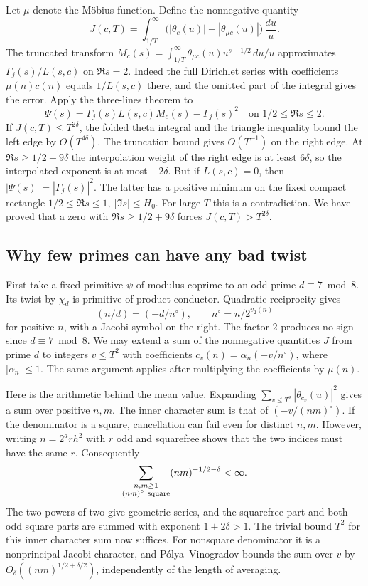 Let \(\mu\) denote the Möbius function. Define the nonnegative quantity
\[
 J(c,T)=\int_{1/T}^\infty
       \bigl(|\theta_c(u)|+|\theta_{\mu c}(u)|\bigr)\,\frac{du}{u}.
\]
The truncated transform \(M_c(s)=\int_{1/T}^\infty \theta_{\mu c}(u)u^{s-1/2}\,du/u\) approximates \(\Gamma_j(s)/L(s,c)\) on \(\Re s=2\). Indeed the full Dirichlet series with coefficients \(\mu(n)c(n)\) equals \(1/L(s,c)\) there, and the omitted part of the integral gives the error. Apply the three-lines theorem to
\[
  \Psi(s)=\Gamma_j(s)L(s,c)M_c(s)-\Gamma_j(s)^2
       \quad\text{on }1/2\le\Re s\le2.
\]
If \(J(c,T)\le T^{2\delta}\), the folded theta integral and the triangle inequality bound the left edge by \(O(T^{4\delta})\). The truncation bound gives \(O(T^{-1})\) on the right edge. At \(\Re s\ge1/2+9\delta\) the interpolation weight of the right edge is at least \(6\delta\), so the interpolated exponent is at most \(-2\delta\). But if \(L(s,c)=0\), then \(|\Psi(s)|=|\Gamma_j(s)|^2\). The latter has a positive minimum on the fixed compact rectangle \(1/2\le\Re s\le1,\ |\Im s|\le H_0\). For large \(T\) this is a contradiction. We have proved that a zero with \(\Re s\ge1/2+9\delta\) forces \(J(c,T)>T^{2\delta}\).

\subsection{Why few primes can have any bad twist}
First take a fixed primitive \(\psi\) of modulus coprime to an odd prime \(d\equiv7\bmod8\). Its twist by \(\chi_d\) is primitive of product conductor. Quadratic reciprocity gives
\[
           (n/d)=(-d/n^\circ),\qquad n^\circ=n/2^{v_2(n)}
\]
for positive \(n\), with a Jacobi symbol on the right. The factor \(2\) produces no sign since \(d\equiv7\bmod8\). We may extend a sum of the nonnegative quantities \(J\) from prime \(d\) to integers \(v\le T^2\) with coefficients \(c_v(n)=\alpha_n(-v/n^\circ)\), where \(|\alpha_n|\le1\). The same argument applies after multiplying the coefficients by \(\mu(n)\).

Here is the arithmetic behind the mean value. Expanding \(\sum_{v\le T^2}|\theta_{c_v}(u)|^2\) gives a sum over positive \(n,m\). The inner character sum is that of \((-v/(nm)^\circ)\). If the denominator is a square, cancellation can fail even for distinct \(n,m\). However, writing \(n=2^a r h^2\) with \(r\) odd and squarefree shows that the two indices must have the same \(r\). Consequently
\[
      \sum_{\substack{n,m\ge1\\(nm)^\circ\ {\rm square}}}(nm)^{-1/2-\delta}<\infty.
\]
The two powers of two give geometric series, and the squarefree part and both odd square parts are summed with exponent \(1+2\delta>1\). The trivial bound \(T^2\) for this inner character sum now suffices. For nonsquare denominator it is a nonprincipal Jacobi character, and Pólya--Vinogradov bounds the sum over \(v\) by \(O_\delta((nm)^{1/2+\delta/2})\), independently of the length of averaging.

